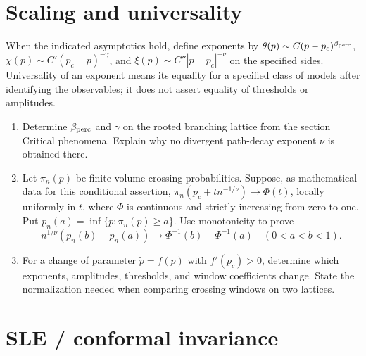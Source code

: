 \section{Scaling and universality}

\begin{exercise}
When the indicated asymptotics hold, define exponents by
$\theta(p)\sim C(p-p_c)^{\beta_{\rm perc}}$,
$\chi(p)\sim C'(p_c-p)^{-\gamma}$, and
$\xi(p)\sim C''|p-p_c|^{-\nu}$ on the specified sides.
Universality of an exponent means its equality for a
specified class of models after identifying the observables;
it does not assert equality of thresholds or amplitudes.
\begin{enumerate}[label=(\alph*)]
\item Determine $\beta_{\rm perc}$ and $\gamma$ on the
rooted branching lattice from the section Critical phenomena.
Explain why no divergent path-decay exponent $\nu$ is
obtained there.
\item Let $\pi_n(p)$ be finite-volume crossing probabilities.
Suppose, as mathematical data for this conditional assertion,
$\pi_n(p_c+t n^{-1/\nu})\to\Phi(t)$, locally uniformly
in $t$, where $\Phi$ is continuous and strictly increasing
from zero to one. Put
$p_n(a)=\inf\{p:\pi_n(p)\ge a\}$.
Use monotonicity to prove
\[
 n^{1/\nu}(p_n(b)-p_n(a))
 \longrightarrow \Phi^{-1}(b)-\Phi^{-1}(a)
 \quad(0<a<b<1).
\]
\item For a change of parameter $\widetilde p=f(p)$ with
$f'(p_c)>0$, determine which exponents, amplitudes, thresholds,
and window coefficients change. State the normalization
needed when comparing crossing windows on two lattices.
\end{enumerate}
\end{exercise}

\section{SLE / conformal invariance}

